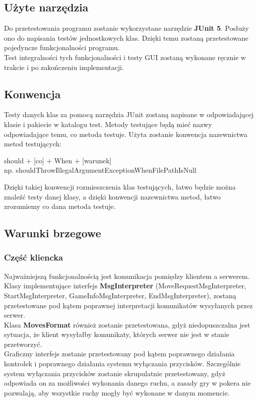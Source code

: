\documentclass{article}
\begin{document}
    \subsection{Użyte narzędzia}
        Do przetestowania programu zostanie wykorzystane narzędzie \textbf{JUnit 5}.
        Posłuży ono do napisania testów jednostkowych klas.
        Dzięki temu zostaną przetestowane pojedyncze funkcjonalności programu.
        \\
        Test integralności tych funkcjonalności i testy GUI zostaną wykonane ręcznie w trakcie i po zakończeniu implementacji.
    
    \subsection{Konwencja}
        Testy danych klas za pomocą narzędzia JUnit zostaną napisane w odpowiadającej klasie i pakiecie w katalogu test.
        Metody testujące będą mieć nazwy odpowiadające temu, co metoda testuje.
        Użyta zostanie konwencja nazewnictwa metod testujących: 
        \begin{center}
            should + [co] + When + [warunek]\\
            np. shouldThrowIllegalArgumentExceptionWhenFilePathIsNull
        \end{center}
        Dzięki takiej konwencji rozmieszczenia klas testujących, łatwo będzie można znaleźć testy danej klasy, a dzięki konwencji nazewnictwa metod, łatwo zrozumiemy co dana metoda testuje.
    
    \subsection{Warunki brzegowe}
        \subsubsection{Część kliencka}
            Najważniejszą funkcjonalnością jest komunikacja pomiędzy klientem a serwerem.
            Klasy implementujące interfejs \textbf{MsgInterpreter}
                (MoveRequestMsgInterpreter, StartMsgInterpreter, GameInfoMsgInterpreter, EndMsgInterpreter),
            zostaną przetestowane pod kątem poprawnej interpretacji komunikatów wysyłanych przez serwer.\\
            Klasa \textbf{MovesFormat} również zostanie przetestowana, gdyż niedopuszczalna jest sytuacja, że klient wysyłałby komunikaty, których serwer nie jest w stanie przetworzyć.
            \\
            Graficzny interfejs zostanie przetestowany pod kątem poprawnego działania kontrolek i poprawnego działania systemu wyłączania przycisków.
            Szczególnie system wyłączania przycisków zostanie skrupulatnie przetestowany, gdyż odpowiada on za możliwości wykonania danego ruchu, a zasady gry w pokera nie pozwalają, aby wszystkie ruchy mogły być wykonane w danym momencie.
                
\end{document}
